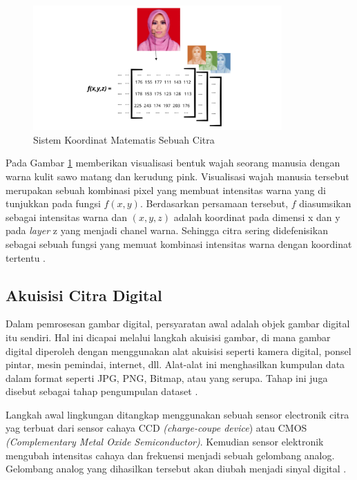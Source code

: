     \begin{figure}[H]
      \centering
      \includegraphics[width=0.85\textwidth]{figures/bab2/citra_digital.png}
      \caption[Sistem Koordinat Matematis Sebuah Citra]{Sistem Koordinat Matematis Sebuah Citra \cite{Kirana2021}}
      \label{Sistem Koordinat Matematis Sebuah Citra}
    \end{figure}




    
    
    Pada Gambar \ref{Sistem Koordinat Matematis Sebuah Citra} memberikan visualisasi bentuk wajah seorang manusia 
    dengan warna kulit sawo matang dan kerudung pink. Visualisasi wajah manusia tersebut merupakan sebuah kombinasi
     pixel yang membuat intensitas warna yang di tunjukkan pada fungsi $f(x,y)$. Berdasarkan persamaan tersebut, $f$ 
     diasumsikan sebagai intensitas warna dan $(x,y,z)$ adalah koordinat pada dimensi x dan y pada \textit{layer} z yang menjadi chanel warna. 
     Sehingga citra sering didefenisikan sebagai sebuah fungsi yang memuat kombinasi intensitas warna dengan koordinat
      tertentu \cite{Kirana2021}.

\subsection{Akuisisi Citra  Digital}

    Dalam pemrosesan gambar digital, persyaratan awal adalah objek gambar digital itu sendiri. Hal ini dicapai melalui langkah akuisisi gambar, di mana gambar digital diperoleh dengan menggunakan alat akuisisi seperti kamera digital, ponsel pintar, mesin pemindai, internet, dll. Alat-alat ini menghasilkan kumpulan data dalam format seperti JPG, PNG, Bitmap, atau yang serupa. Tahap ini juga disebut sebagai tahap pengumpulan dataset \cite{Dewi2018}.
    
    
    Langkah awal lingkungan ditangkap menggunakan sebuah sensor electronik citra yag terbuat dari sensor cahaya CCD \textit{(charge-coupe device}) atau CMOS \textit{(Complementary Metal Oxide Semiconductor)}. Kemudian sensor elektronik mengubah intensitas cahaya dan frekuensi menjadi sebuah gelombang analog. Gelombang analog yang dihasilkan tersebut akan diubah menjadi sinyal digital \cite{putra2010pengolahan}.

